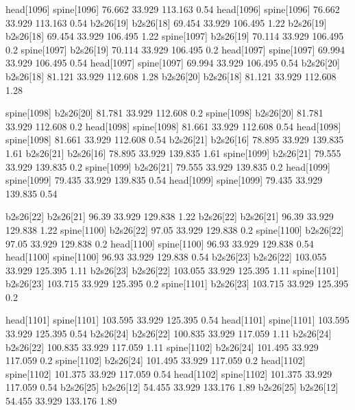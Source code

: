 head[1096]    spine[1096]    76.662    33.929    113.163    0.54
head[1096]    spine[1096]    76.662    33.929    113.163    0.54
b2s26[19]    b2s26[18]    69.454    33.929    106.495    1.22
b2s26[19]    b2s26[18]    69.454    33.929    106.495    1.22
spine[1097]    b2s26[19]    70.114    33.929    106.495    0.2
spine[1097]    b2s26[19]    70.114    33.929    106.495    0.2
head[1097]    spine[1097]    69.994    33.929    106.495    0.54
head[1097]    spine[1097]    69.994    33.929    106.495    0.54
b2s26[20]    b2s26[18]    81.121    33.929    112.608    1.28
b2s26[20]    b2s26[18]    81.121    33.929    112.608    1.28


spine[1098]    b2s26[20]    81.781    33.929    112.608    0.2
spine[1098]    b2s26[20]    81.781    33.929    112.608    0.2
head[1098]    spine[1098]    81.661    33.929    112.608    0.54
head[1098]    spine[1098]    81.661    33.929    112.608    0.54
b2s26[21]    b2s26[16]    78.895    33.929    139.835    1.61
b2s26[21]    b2s26[16]    78.895    33.929    139.835    1.61
spine[1099]    b2s26[21]    79.555    33.929    139.835    0.2
spine[1099]    b2s26[21]    79.555    33.929    139.835    0.2
head[1099]    spine[1099]    79.435    33.929    139.835    0.54
head[1099]    spine[1099]    79.435    33.929    139.835    0.54


b2s26[22]    b2s26[21]    96.39    33.929    129.838    1.22
b2s26[22]    b2s26[21]    96.39    33.929    129.838    1.22
spine[1100]    b2s26[22]    97.05    33.929    129.838    0.2
spine[1100]    b2s26[22]    97.05    33.929    129.838    0.2
head[1100]    spine[1100]    96.93    33.929    129.838    0.54
head[1100]    spine[1100]    96.93    33.929    129.838    0.54
b2s26[23]    b2s26[22]    103.055    33.929    125.395    1.11
b2s26[23]    b2s26[22]    103.055    33.929    125.395    1.11
spine[1101]    b2s26[23]    103.715    33.929    125.395    0.2
spine[1101]    b2s26[23]    103.715    33.929    125.395    0.2


head[1101]    spine[1101]    103.595    33.929    125.395    0.54
head[1101]    spine[1101]    103.595    33.929    125.395    0.54
b2s26[24]    b2s26[22]    100.835    33.929    117.059    1.11
b2s26[24]    b2s26[22]    100.835    33.929    117.059    1.11
spine[1102]    b2s26[24]    101.495    33.929    117.059    0.2
spine[1102]    b2s26[24]    101.495    33.929    117.059    0.2
head[1102]    spine[1102]    101.375    33.929    117.059    0.54
head[1102]    spine[1102]    101.375    33.929    117.059    0.54
b2s26[25]    b2s26[12]    54.455    33.929    133.176    1.89
b2s26[25]    b2s26[12]    54.455    33.929    133.176    1.89



